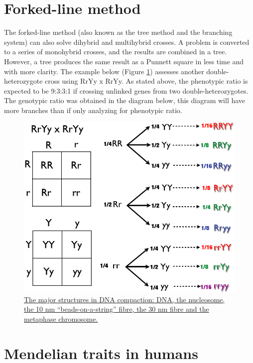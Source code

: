 \hypertarget{forked-line-method}{%
\section{Forked-line method}\label{forked-line-method}}

The forked-line method (also known as the tree method and the branching system) can also solve dihybrid and multihybrid crosses. A problem is converted to a series of monohybrid crosses, and the results are combined in a tree. However, a tree produces the same result as a Punnett square in less time and with more clarity. The example below (Figure \ref{fig:forkedline}) assesses another double-heterozygote cross using RrYy x RrYy. As stated above, the phenotypic ratio is expected to be 9:3:3:1 if crossing unlinked genes from two double-heterozygotes. The genotypic ratio was obtained in the diagram below, this diagram will have more branches than if only analyzing for phenotypic ratio.



\begin{figure}

{\centering \includegraphics[width=0.7\linewidth]{./figures/mendel/Dihybrid_Cross_Tree_Method} 

}

\caption{\href{https://commons.wikimedia.org/wiki/File:Dihybrid_Cross_Tree_Method.png}{The major structures in DNA compaction: DNA, the nucleosome, the 10 nm ``beads-on-a-string'' fibre, the 30 nm fibre and the metaphase chromosome.}}\label{fig:forkedline}
\end{figure}

\hypertarget{mendelian-traits-in-humans}{%
\section{Mendelian traits in humans}\label{mendelian-traits-in-humans}}

